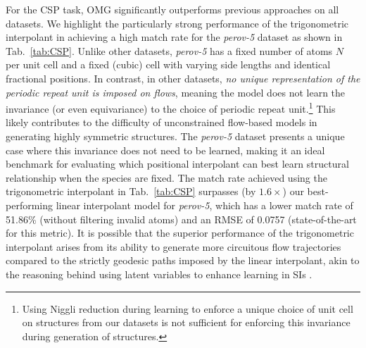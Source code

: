 For the CSP task, OMG significantly outperforms previous approaches on all datasets. We highlight the particularly strong performance of the trigonometric interpolant in achieving a high match rate for the \textit{perov-5} dataset as shown in Tab.~\ref{tab:CSP}.
Unlike other datasets, \textit{perov-5} has a fixed number of atoms $N$ per unit cell and a fixed (cubic) cell with varying side lengths and identical fractional positions.
In contrast, in other datasets, \emph{no unique representation of the periodic repeat unit is imposed on flows}, meaning the model does not learn the invariance (or even equivariance) to the choice of periodic repeat unit.\footnote{Using Niggli reduction during learning to enforce a unique choice of unit cell on structures from our datasets is not sufficient for enforcing this invariance during generation of structures.} This likely contributes to the difficulty of unconstrained flow-based models in generating highly symmetric structures.
The \textit{perov-5} dataset presents a unique case where this invariance does not need to be learned,  making it an ideal benchmark for evaluating which positional interpolant can best learn structural relationship when the species are fixed.
The match rate achieved using the trigonometric interpolant in Tab.~\ref{tab:CSP} surpasses (by $1.6\times$) our best-performing linear interpolant model for \textit{perov-5}, which has a lower match rate of 51.86\% (without filtering invalid atoms) and an RMSE of 0.0757 (state-of-the-art for this metric).
It is possible that the superior performance of the trigonometric interpolant arises from its ability to generate more circuitous flow trajectories compared to the strictly geodesic paths imposed by the linear interpolant, akin to the reasoning behind using latent variables to enhance learning in SIs \citep{albergo_stochastic_2023}.



